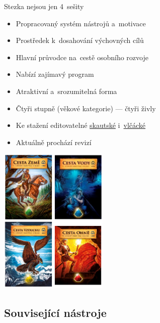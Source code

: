 \documentclass[compress, ucs, xelatex, 11pt, xcolor=dvipsnames, print,
	hyperref={
		bookmarks=true,
		unicode=true,
		colorlinks=true,
		pdftitle={Skautska vychovna metoda},
		plainpages=false,
		pdfauthor={Vojtech Zeisek},
		pdfsubject={Skautska vychovna metoda a jeji vyvoj za posledni stoleti a desetileti},
		pdfcreator={XeLaTeX},
		pdfkeywords={Junak, Pedagogika, Skaut, Skauting, Vychovna metoda},
		linkcolor=Black,
		anchorcolor=Black,
		citecolor=OliveGreen,
		filecolor=OliveGreen,
		menucolor=Black,
		urlcolor=OliveGreen,
		pdftex},
	url={hyphens, lowtilde} %
	]{beamer}
\begin{document}
\begin{frame}{Stezka nejsou jen 4~sešity}
	\begin{multicols}{2}
		\begin{itemize}
			\item Propracovaný systém nástrojů a~motivace
			\item Prostředek k~dosahování výchovných cílů
			\item Hlavní průvodce na~cestě osobního rozvoje
			\item Nabízí zajímavý program
			\item Atraktivní a~srozumitelná forma
			\item Čtyři stupně (věkové kategorie) --- čtyři živly
			\item Ke stažení editovatelné \href{https://krizovatka.skaut.cz/oddil/program/skautky-a-skauti/skauti-skautky-stezky}{skautské} i~\href{https://krizovatka.skaut.cz/oddil/program/svetlusky-a-vlcata/vlcata-svetlusky-stezky}{vlčácké}
			\item Aktuálně prochází revizí
		\end{itemize}
		\columnbreak
		\includegraphics[height=7cm]{stezky.png}
	\end{multicols}
\end{frame}

\subsection{Související nástroje}
\end{document}
